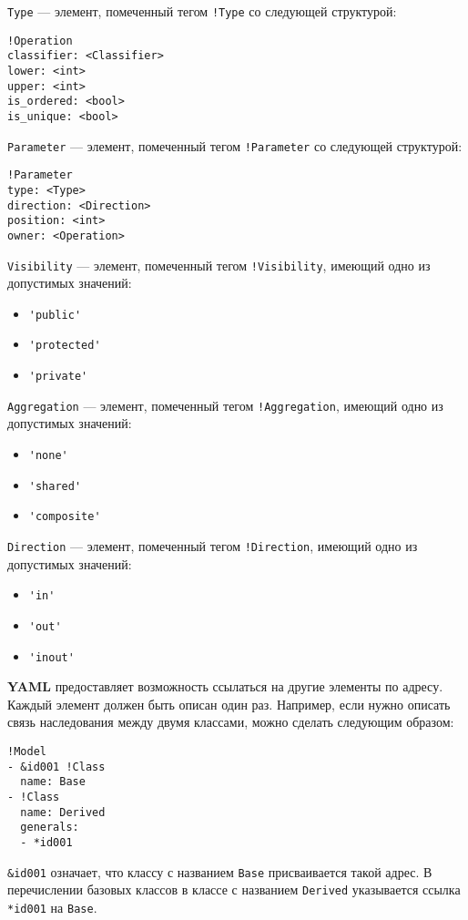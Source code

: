 \verb;Type; --- элемент, помеченный тегом \verb;!Type; со следующей
структурой:
\begin{verbatim}
!Operation
classifier: <Classifier>
lower: <int>
upper: <int>
is_ordered: <bool>
is_unique: <bool>
\end{verbatim}

\verb;Parameter; --- элемент, помеченный тегом \verb;!Parameter; со следующей
структурой:
\begin{verbatim}
!Parameter
type: <Type>
direction: <Direction>
position: <int>
owner: <Operation>
\end{verbatim}

\verb;Visibility; --- элемент, помеченный тегом \verb;!Visibility;,
имеющий одно из допустимых значений:
\begin{itemize}
\item \verb;'public';
\item \verb;'protected';
\item \verb;'private';
\end{itemize}

\verb;Aggregation; --- элемент, помеченный тегом \verb;!Aggregation;,
имеющий одно из допустимых значений:
\begin{itemize}
\item \verb;'none';
\item \verb;'shared';
\item \verb;'composite';
\end{itemize}

\verb;Direction; --- элемент, помеченный тегом \verb;!Direction;,
имеющий одно из допустимых значений:
\begin{itemize}
\item \verb;'in';
\item \verb;'out';
\item \verb;'inout';
\end{itemize}

\textbf{YAML} предоставляет возможность ссылаться на другие элементы по адресу.
Каждый элемент должен быть описан один раз.
Например, если нужно описать связь наследования между двумя классами, можно
сделать следующим образом:
\begin{verbatim}
!Model
- &id001 !Class
  name: Base
- !Class
  name: Derived
  generals:
  - *id001
\end{verbatim}

\verb;&id001; означает, что классу с названием \verb;Base; присваивается такой
адрес. В перечислении базовых классов в классе с названием \verb;Derived;
указывается ссылка \verb;*id001; на \verb;Base;.

